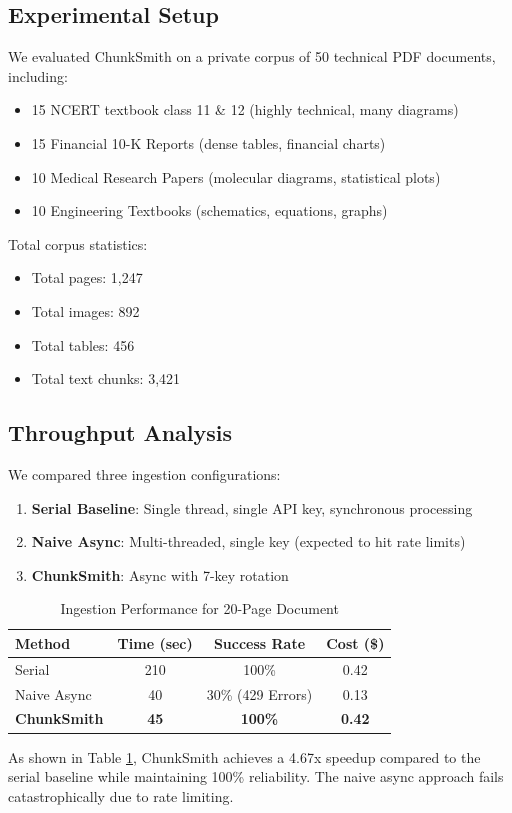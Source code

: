 \documentclass[conference]{IEEEtran}
\begin{document}
\subsection{Experimental Setup}
We evaluated ChunkSmith on a private corpus of 50 technical PDF documents, including:
\begin{itemize}
    \item 15 NCERT textbook class 11 \& 12 (highly technical, many diagrams)
    \item 15 Financial 10-K Reports (dense tables, financial charts)
    \item 10 Medical Research Papers (molecular diagrams, statistical plots)
    \item 10 Engineering Textbooks (schematics, equations, graphs)
\end{itemize}
Total corpus statistics:
\begin{itemize}
    \item Total pages: 1,247
    \item Total images: 892
    \item Total tables: 456
    \item Total text chunks: 3,421
\end{itemize}

\subsection{Throughput Analysis}
We compared three ingestion configurations:
\begin{enumerate}
    \item \textbf{Serial Baseline}: Single thread, single API key, synchronous processing
    \item \textbf{Naive Async}: Multi-threaded, single key (expected to hit rate limits)
    \item \textbf{ChunkSmith}: Async with 7-key rotation
\end{enumerate}
\begin{table}[h]
\centering
\caption{Ingestion Performance for 20-Page Document}
\begin{tabular}{@{}lccc@{}}
\toprule
\textbf{Method} & \textbf{Time (sec)} & \textbf{Success Rate} & \textbf{Cost (\$)} \\ \midrule
Serial          & 210                 & 100\%                 & 0.42 \\
Naive Async     & 40                  & 30\% (429 Errors)     & 0.13 \\
\textbf{ChunkSmith} & \textbf{45}     & \textbf{100\%}        & \textbf{0.42} \\ \bottomrule
\end{tabular}
\label{tab:perf}
\end{table}
As shown in Table \ref{tab:perf}, ChunkSmith achieves a 4.67x speedup compared to the serial baseline while maintaining 100\% reliability. The naive async approach fails catastrophically due to rate limiting.
\end{document}
